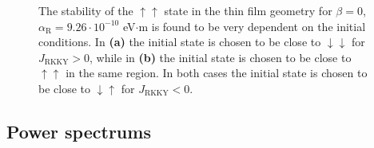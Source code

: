 \begin{figure}[h!]
\caption{The stability of the $\uparrow\uparrow$ state in the thin film geometry for $\beta = 0$, $\alpha_\text{R} = 9.26\cdot10^{-10}$ eV$\cdot$m is found to be very dependent on the initial conditions. In \textbf{(a)} the initial state is chosen to be close to $\downarrow\downarrow$ for $J_{\text{RKKY}}>0$, while in \textbf{(b)} the initial state is chosen to be close to $\uparrow\uparrow$ in the same region. In both cases the initial state is chosen to be close to $\downarrow\uparrow$ for $J_{\text{RKKY}}<0$.}
\label{fig:STOFilmStability}
\end{figure}

\subsection{Power spectrums}
